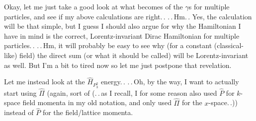 \documentclass{report}
\begin{document}

Okay, let me just take a good look at what becomes of the $\gamma$s for multiple particles, and see if my above calculations are right.\,. .\,.\,Hm.\,. Yes, the calculation will be that simple, but I guess I should also argue for why the Hamiltonian I have in mind is the correct, Lorentz-invariant Dirac Hamiltonian for multiple particles.\,. .\,.\,Hm, it will probably be easy to see why (for a constant (classical-like) field) the direct sum (or what it should be called) will be Lorentz-invariant as well. But I'm a bit to tired now so let me just postpone that revelation. 

Let me instead look at the $\hat H_{P_3^2}$ energy.\,. .\,.\,Oh, by the way, I want to actually start using $\hat \Pi$ (again, sort of (.\,.\,as I recall, I for some reason also used $\hat P$ for $k$-space field momenta in my old notation, and only used $\hat \Pi$ for the $x$-space.\,.)) instead of $\hat P$ for the field/lattice momenta. 
\end{document}
